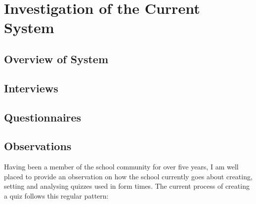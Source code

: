 \section{Investigation of the Current System}

\subsection{Overview of System}

\subsection{Interviews}

\subsection{Questionnaires}

\subsection{Observations}
Having been a member of the school community for over five years, I am well placed to provide an observation on how the school currently goes about creating, setting and analysing quizzes used in form times. The current process of creating a quiz follows this regular pattern:

